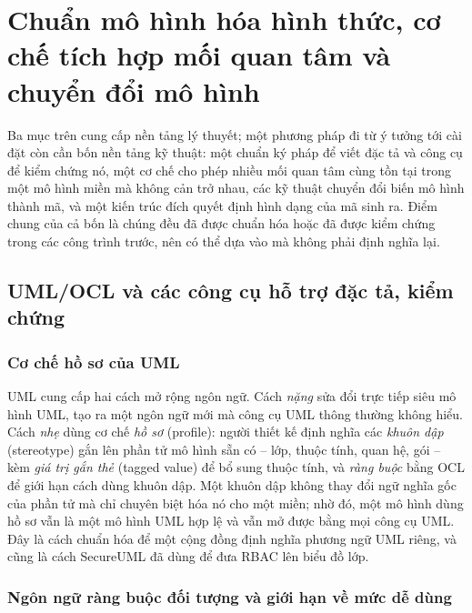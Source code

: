 \section{Chuẩn mô hình hóa hình thức, cơ chế tích hợp mối quan tâm và chuyển đổi mô hình}
\label{sec:nen-tang}

Ba mục trên cung cấp nền tảng lý thuyết; một phương pháp đi từ ý tưởng tới cài đặt còn cần bốn nền tảng kỹ thuật: một chuẩn ký pháp để viết đặc tả và công cụ để kiểm chứng nó, một cơ chế cho phép nhiều mối quan tâm cùng tồn tại trong một mô hình miền mà không cản trở nhau, các kỹ thuật chuyển đổi biến mô hình thành mã, và một kiến trúc đích quyết định hình dạng của mã sinh ra. Điểm chung của cả bốn là chúng đều đã được chuẩn hóa hoặc đã được kiểm chứng trong các công trình trước, nên có thể dựa vào mà không phải định nghĩa lại.

\subsection{UML/OCL và các công cụ hỗ trợ đặc tả, kiểm chứng}
\label{sec:uml-ocl}

\subsubsection{Cơ chế hồ sơ của UML}

UML \cite{omg2017uml} cung cấp hai cách mở rộng ngôn ngữ. Cách \emph{nặng} sửa đổi trực tiếp siêu mô hình UML, tạo ra một ngôn ngữ mới mà công cụ UML thông thường không hiểu. Cách \emph{nhẹ} dùng cơ chế \emph{hồ sơ} (profile): người thiết kế định nghĩa các \emph{khuôn dập} (stereotype) gắn lên phần tử mô hình sẵn có -- lớp, thuộc tính, quan hệ, gói -- kèm \emph{giá trị gắn thẻ} (tagged value) để bổ sung thuộc tính, và \emph{ràng buộc} bằng OCL để giới hạn cách dùng khuôn dập. Một khuôn dập không thay đổi ngữ nghĩa gốc của phần tử mà chỉ chuyên biệt hóa nó cho một miền; nhờ đó, một mô hình dùng hồ sơ vẫn là một mô hình UML hợp lệ và vẫn mở được bằng mọi công cụ UML. Đây là cách chuẩn hóa để một cộng đồng định nghĩa phương ngữ UML riêng, và cũng là cách SecureUML \cite{lodderstedt2002} đã dùng để đưa RBAC lên biểu đồ lớp.

\subsubsection{Ngôn ngữ ràng buộc đối tượng và giới hạn về mức dễ dùng}

